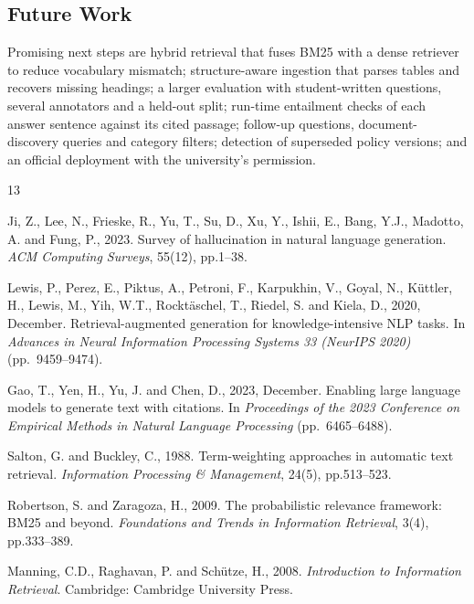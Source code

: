 \documentclass[conference]{IEEEtran}
\begin{document}
\subsection{Future Work}
Promising next steps are hybrid retrieval that fuses BM25 with a dense retriever to reduce vocabulary mismatch; structure-aware ingestion that parses tables and recovers missing headings; a larger evaluation with student-written questions, several annotators and a held-out split; run-time entailment checks of each answer sentence against its cited passage; follow-up questions, document-discovery queries and category filters; detection of superseded policy versions; and an official deployment with the university's permission.

\begin{thebibliography}{13}
\footnotesize

Ji, Z., Lee, N., Frieske, R., Yu, T., Su, D., Xu, Y., Ishii, E., Bang, Y.J., Madotto, A. and Fung, P., 2023. Survey of hallucination in natural language generation. \textit{ACM Computing Surveys}, 55(12), pp.1--38.

Lewis, P., Perez, E., Piktus, A., Petroni, F., Karpukhin, V., Goyal, N., K\"uttler, H., Lewis, M., Yih, W.T., Rockt\"aschel, T., Riedel, S. and Kiela, D., 2020, December. Retrieval-augmented generation for knowledge-intensive NLP tasks. In \textit{Advances in Neural Information Processing Systems 33 (NeurIPS 2020)} (pp.~9459--9474).

Gao, T., Yen, H., Yu, J. and Chen, D., 2023, December. Enabling large language models to generate text with citations. In \textit{Proceedings of the 2023 Conference on Empirical Methods in Natural Language Processing} (pp.~6465--6488).

Salton, G. and Buckley, C., 1988. Term-weighting approaches in automatic text retrieval. \textit{Information Processing \& Management}, 24(5), pp.513--523.

Robertson, S. and Zaragoza, H., 2009. The probabilistic relevance framework: BM25 and beyond. \textit{Foundations and Trends in Information Retrieval}, 3(4), pp.333--389.

Manning, C.D., Raghavan, P. and Sch\"utze, H., 2008. \textit{Introduction to Information Retrieval}. Cambridge: Cambridge University Press.


\end{thebibliography}
\end{document}
